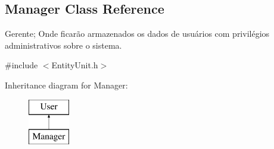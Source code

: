 \hypertarget{classManager}{\subsection{Manager Class Reference}
\label{dd/dcd/classManager}
}


Gerente; Onde ficarão armazenados os dados de usuários com privilégios administrativos sobre o sistema.  




{\ttfamily \#include $<$Entity\-Unit.\-h$>$}

Inheritance diagram for Manager\-:\begin{figure}[H]
\begin{center}
\leavevmode
\includegraphics[height=2.000000cm]{dd/dcd/classManager}
\end{center}
\end{figure}

